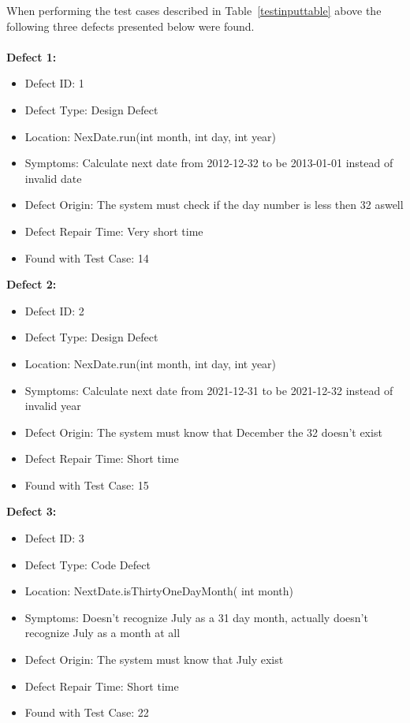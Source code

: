 When performing the test cases described in Table~\ref{testinputtable} above the following three defects presented below were found.\\\\


\noindent\textbf{Defect 1:}
\begin{itemize}
 \item Defect ID: 1
 \item Defect Type: Design Defect
 \item Location: NexDate.run(int month, int day, int year)
 \item Symptoms: Calculate next date from 2012-12-32 to be 2013-01-01 instead of invalid date
 \item Defect Origin: The system must check if the day number is less then 32 aswell
 \item Defect Repair Time: Very short time
 \item Found with Test Case: 14
\end{itemize}

\noindent \textbf{Defect 2:}
\begin{itemize}
 \item Defect ID: 2
 \item Defect Type: Design Defect
 \item Location: NexDate.run(int month, int day, int year)
 \item Symptoms: Calculate next date from 2021-12-31 to be 2021-12-32 instead of invalid year
 \item Defect Origin: The system must know that December the 32 doesn't exist
 \item Defect Repair Time: Short time
 \item Found with Test Case: 15
\end{itemize}

\noindent \textbf{Defect 3:}
\begin{itemize}
 \item Defect ID: 3
 \item Defect Type: Code Defect
 \item Location: NextDate.isThirtyOneDayMonth( int month)
 \item Symptoms: Doesn't recognize July as a 31 day month, actually doesn't recognize July as a month at all
 \item Defect Origin: The system must know that July exist
 \item Defect Repair Time: Short time
 \item Found with Test Case: 22 
\end{itemize}


